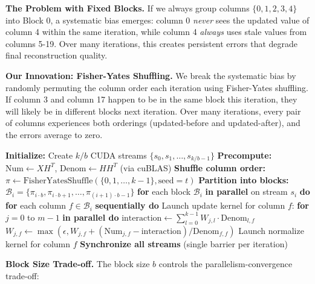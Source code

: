 \documentclass[11pt]{article}
\begin{document}
\textbf{The Problem with Fixed Blocks.} If we always group columns $\{0,1,2,3,4\}$ into Block 0, a systematic bias emerges: column 0 \textit{never} sees the updated value of column 4 within the same iteration, while column 4 \textit{always} uses stale values from columns 5-19. Over many iterations, this creates persistent errors that degrade final reconstruction quality.

\textbf{Our Innovation: Fisher-Yates Shuffling.} We break the systematic bias by randomly permuting the column order each iteration using Fisher-Yates shuffling. If column 3 and column 17 happen to be in the same block this iteration, they will likely be in different blocks next iteration. Over many iterations, every pair of columns experiences both orderings (updated-before and updated-after), and the errors average to zero.

\begin{algorithm}[H]
\caption{HALS GPU Block: Stochastic Parallelism (Our Innovation)}
\begin{algorithmic}
\STATE \textbf{Initialize:} Create $k/b$ CUDA streams $\{s_0, s_1, \ldots, s_{k/b-1}\}$
\STATE
{}
    \STATE \textbf{Precompute:} $\text{Num} \leftarrow XH^T$, $\text{Denom} \leftarrow HH^T$ (via cuBLAS)
    \STATE
    \STATE \textbf{Shuffle column order:} $\pi \leftarrow \text{FisherYatesShuffle}(\{0, 1, \ldots, k-1\}, \text{seed}=t)$
    \STATE \textbf{Partition into blocks:} $\mathcal{B}_i = \{\pi_{i \cdot b}, \pi_{i \cdot b + 1}, \ldots, \pi_{(i+1) \cdot b - 1}\}$
    \STATE
    \STATE \textbf{for} each block $\mathcal{B}_i$ \textbf{in parallel} on stream $s_i$ \textbf{do}
    \STATE \quad \textbf{for} each column $f \in \mathcal{B}_i$ \textbf{sequentially do}
    \STATE \quad \quad Launch update kernel for column $f$:
    \STATE \quad \quad \quad \textbf{for} $j = 0$ to $m-1$ \textbf{in parallel do}
    \STATE \quad \quad \quad \quad $\text{interaction} \leftarrow \sum_{l=0}^{k-1} W_{j,l} \cdot \text{Denom}_{l,f}$
    \STATE \quad \quad \quad \quad $W_{j,f} \leftarrow \max(\epsilon, W_{j,f} + (\text{Num}_{j,f} - \text{interaction}) / \text{Denom}_{f,f})$
    \STATE \quad \quad Launch normalize kernel for column $f$
    \STATE
    \STATE \textbf{Synchronize all streams} (single barrier per iteration)
\ENDFOR
\end{algorithmic}
\end{algorithm}

\textbf{Block Size Trade-off.} The block size $b$ controls the parallelism-convergence trade-off:
\end{document}
